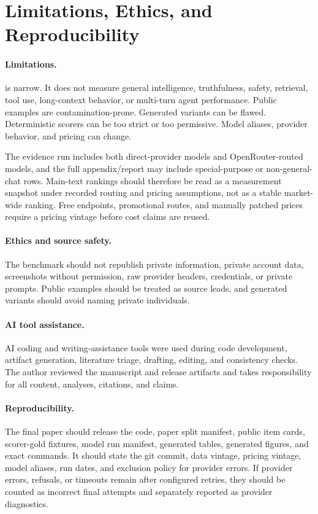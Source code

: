 \section{Limitations, Ethics, and Reproducibility}

\paragraph{Limitations.}
\benchmarkname{} is narrow. It does not measure general intelligence,
truthfulness, safety, retrieval, tool use, long-context behavior, or multi-turn
agent performance. Public examples are contamination-prone. Generated variants
can be flawed. Deterministic scorers can be too strict or too permissive.
Model aliases, provider behavior, and pricing can change.

The evidence run includes both direct-provider models and OpenRouter-routed
models, and the full appendix/report may include special-purpose or
non-general-chat rows. Main-text rankings should therefore be read as a
measurement snapshot under recorded routing and pricing assumptions, not as a
stable market-wide ranking. Free endpoints, promotional routes, and manually
patched prices require a pricing vintage before cost claims are reused.

\paragraph{Ethics and source safety.}
The benchmark should not republish private information, private account data,
screenshots without permission, raw provider headers, credentials, or private
prompts. Public examples should be treated as source leads, and generated
variants should avoid naming private individuals.

\paragraph{AI tool assistance.}
AI coding and writing-assistance tools were used during code development,
artifact generation, literature triage, drafting, editing, and consistency
checks. The author reviewed the manuscript and release artifacts and takes
responsibility for all content, analyses, citations, and claims.

\paragraph{Reproducibility.}
The final paper should release the code, paper split manifest, public item
cards, scorer-gold fixtures, model run manifest, generated tables, generated
figures, and exact commands. It should state the git commit, data vintage,
pricing vintage, model aliases, run dates, and exclusion policy for provider
errors. If provider errors, refusals, or timeouts remain after configured
retries, they should be counted as incorrect final attempts and separately
reported as provider diagnostics.

\begin{table}[t]
  \centering
  \caption{Current paper-readiness gates.}
  \label{tab:readiness-gates}
  
\end{table}
